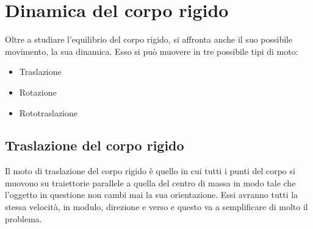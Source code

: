 \section{Dinamica del corpo rigido}

Oltre a studiare l'equilibrio del corpo rigido, si affronta anche il suo possibile movimento, la sua dinamica. Esso si può muovere in tre possibile tipi di moto:

\begin{itemize}
	\item Traslazione
	\item Rotazione
	\item Rototraslazione
\end{itemize}

\subsection{Traslazione del corpo rigido}

Il moto di traslazione del corpo rigido è quello in cui tutti i punti del corpo si muovono su traiettorie parallele a quella del centro di massa in modo tale che l'oggetto in questione non cambi mai la sua orientazione. Essi avranno tutti la stessa velocità, in modulo, direzione e verso e questo va a semplificare di molto il problema.


